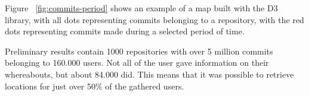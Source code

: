 \documentclass[acmtog, authorversion]{acmart}
\begin{document}
Figure ~\ref{fig:commits-period} shows an example of a map built with the D3 library, with all dots representing commits belonging to a repository, with the red dots representing commits made during a selected period of time.

Preliminary results contain 1000 repositories with over 5 million commits belonging to 160.000 users. 
Not all of the user gave information on their whereabouts, but about 84.000 did.
This means that it was possible to retrieve locations for just over 50\% of the gathered users.



\end{document}
